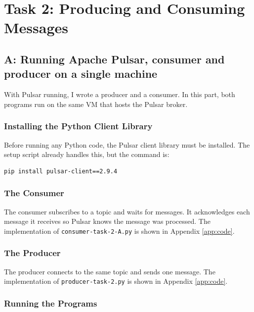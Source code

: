 \documentclass[11pt,a4paper]{article}
\begin{document}
\newpage

\section{Task 2: Producing and Consuming Messages}

\subsection{A: Running Apache Pulsar, consumer and producer on a single
machine}

With Pulsar running, I wrote a producer and a consumer. In this part,
both programs run on the same VM that hosts the Pulsar broker.

\subsubsection{Installing the Python Client Library}

Before running any Python code, the Pulsar client library must be installed.
The setup script already handles this, but the command is:

\begin{lstlisting}[style=shell]
pip install pulsar-client==2.9.4
\end{lstlisting}

\subsubsection{The Consumer}

The consumer subscribes to a topic and waits for messages. It acknowledges
each message it receives so Pulsar knows the message was processed.
The implementation of \texttt{consumer-task-2-A.py} is shown in Appendix \ref{app:code}.

\subsubsection{The Producer}

The producer connects to the same topic and sends one message.
The implementation of \texttt{producer-task-2.py} is shown in Appendix \ref{app:code}.

\subsubsection{Running the Programs}
\end{document}
